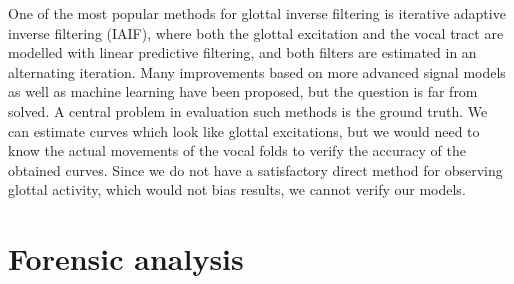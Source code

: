 \documentclass[letterpaper,10pt,english]{jupyterBook}
\begin{document}
\sphinxAtStartPar
One of the most popular methods for glottal inverse filtering is
iterative adaptive inverse filtering (IAIF), where both the glottal
excitation and the vocal tract are modelled with linear predictive
filtering, and both filters are estimated in an alternating iteration.
Many improvements based on more advanced signal models as well as
machine learning have been proposed, but the question is far from
solved. A central problem in evaluation such methods is the ground
truth. We can estimate curves which look like glottal excitations, but
we would need to know the actual movements of the vocal folds to verify
the accuracy of the obtained curves. Since we do not have a satisfactory
direct method for observing glottal activity, which would not bias
results, we cannot verify our models.

\sphinxstepscope


\section{Forensic analysis}
\label{\detokenize{Analysis/Forensic_analysis:forensic-analysis}}\label{\detokenize{Analysis/Forensic_analysis::doc}}
\sphinxstepscope
\end{document}
